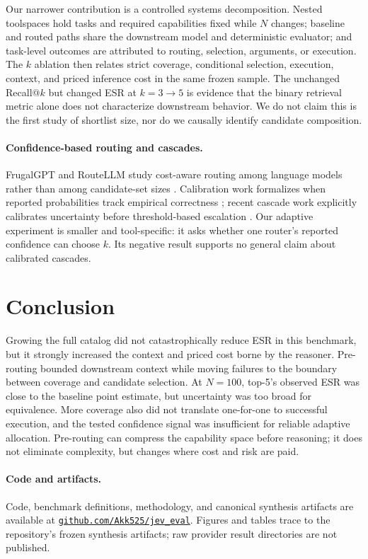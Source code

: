\documentclass[10pt,twocolumn]{article}
\begin{document}
Our narrower contribution is a controlled systems decomposition. Nested toolspaces hold tasks and required capabilities fixed while $N$ changes; baseline and routed paths share the downstream model and deterministic evaluator; and task-level outcomes are attributed to routing, selection, arguments, or execution. The $k$ ablation then relates strict coverage, conditional selection, execution, context, and priced inference cost in the same frozen sample. The unchanged Recall@$k$ but changed ESR at $k=3\rightarrow5$ is evidence that the binary retrieval metric alone does not characterize downstream behavior. We do not claim this is the first study of shortlist size, nor do we causally identify candidate composition.

\paragraph{Confidence-based routing and cascades.}
FrugalGPT and RouteLLM study cost-aware routing among language models rather than among candidate-set sizes \cite{chen2023frugalgpt,ong2024routellm}. Calibration work formalizes when reported probabilities track empirical correctness \cite{guo2017calibration}; recent cascade work explicitly calibrates uncertainty before threshold-based escalation \cite{kotte2026ucci}. Our adaptive experiment is smaller and tool-specific: it asks whether one router's reported confidence can choose $k$. Its negative result supports no general claim about calibrated cascades.

\section{Conclusion}

Growing the full catalog did not catastrophically reduce ESR in this benchmark, but it strongly increased the context and priced cost borne by the reasoner. Pre-routing bounded downstream context while moving failures to the boundary between coverage and candidate selection. At $N=100$, top-5's observed ESR was close to the baseline point estimate, but uncertainty was too broad for equivalence. More coverage also did not translate one-for-one to successful execution, and the tested confidence signal was insufficient for reliable adaptive allocation. Pre-routing can compress the capability space before reasoning; it does not eliminate complexity, but changes where cost and risk are paid.

\paragraph{Code and artifacts.}
Code, benchmark definitions, methodology, and canonical synthesis artifacts are available at \href{https://github.com/Akk525/jev_eval}{\texttt{github.com/Akk525/jev\_eval}}. Figures and tables trace to the repository's frozen synthesis artifacts; raw provider result directories are not published.
\end{document}
